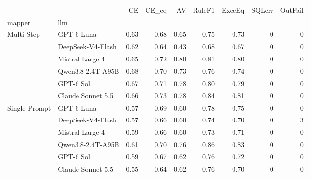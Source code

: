 \begin{tabular}{llrrrrrrr}
\toprule
 &  & CE & CE_eq & AV & RuleF1 & ExecEq & SQLerr & OutFail \\
mapper & llm &  &  &  &  &  &  &  \\
\midrule
\multirow[t]{6}{*}{Multi-Step} & GPT-6 Luna & 0.63 & 0.68 & 0.65 & 0.75 & 0.73 & 0 & 0 \\
 & DeepSeek-V4-Flash & 0.62 & 0.64 & 0.43 & 0.68 & 0.67 & 0 & 0 \\
 & Mistral Large 4 & 0.65 & 0.72 & 0.80 & 0.81 & 0.80 & 0 & 0 \\
 & Qwen3.8-2.4T-A95B & 0.68 & 0.70 & 0.73 & 0.76 & 0.74 & 0 & 0 \\
 & GPT-6 Sol & 0.67 & 0.71 & 0.78 & 0.80 & 0.79 & 0 & 0 \\
 & Claude Sonnet 5.5 & 0.66 & 0.73 & 0.78 & 0.84 & 0.81 & 0 & 0 \\
\cline{1-9}
\multirow[t]{6}{*}{Single-Prompt} & GPT-6 Luna & 0.57 & 0.69 & 0.60 & 0.78 & 0.75 & 0 & 0 \\
 & DeepSeek-V4-Flash & 0.57 & 0.66 & 0.60 & 0.74 & 0.70 & 0 & 3 \\
 & Mistral Large 4 & 0.59 & 0.66 & 0.60 & 0.73 & 0.71 & 0 & 0 \\
 & Qwen3.8-2.4T-A95B & 0.61 & 0.70 & 0.76 & 0.86 & 0.83 & 0 & 0 \\
 & GPT-6 Sol & 0.59 & 0.67 & 0.62 & 0.76 & 0.72 & 0 & 0 \\
 & Claude Sonnet 5.5 & 0.55 & 0.64 & 0.62 & 0.76 & 0.70 & 0 & 0 \\
\cline{1-9}
\bottomrule
\end{tabular}
